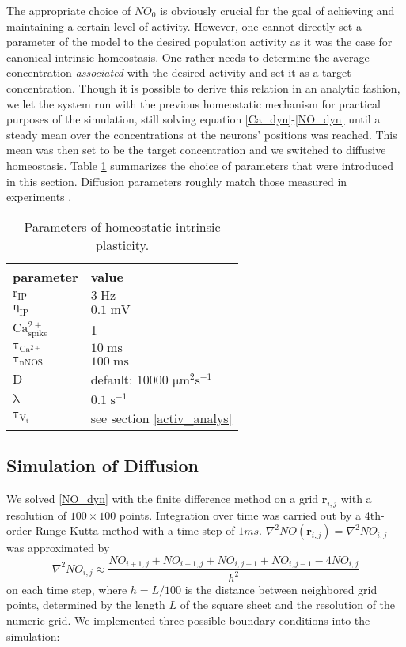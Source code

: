 \documentclass[10pt,a4paper]{article}
\begin{document}
The appropriate choice of $NO_0$ is obviously crucial for the goal of achieving and maintaining a certain level of activity. However, one cannot directly set a parameter of the model to the desired population activity as it was the case for canonical intrinsic homeostasis. One rather needs to determine the average concentration \textit{associated} with the desired activity and set it as a target concentration. Though it is possible to derive this relation in an analytic fashion, we let the system run with the previous homeostatic mechanism for practical purposes of the simulation, still solving equation \eqref{Ca_dyn}-\eqref{NO_dyn} until a steady mean over the concentrations at the neurons' positions was reached. This mean was then set to be the target concentration and we switched to diffusive homeostasis. Table \ref{Params_IP} summarizes the choice of parameters that were introduced in this section. Diffusion parameters roughly match those measured in experiments \cite{Philippides_2000}.
\begin{table}
\begin{tabular}{|l|l|}
\hline
\textbf{parameter} & \textbf{value} \\
\hline
$\mathrm{r_{IP}}$ & $\mathrm{3\;Hz}$ \\
\hline
$\mathrm{\eta_{IP}}$ & $\mathrm{0.1\;mV}$ \\
\hline
$\mathrm{Ca^{2+}_{spike}}$ & 1 \\ \hline
$\mathrm{\tau_{Ca^{2+}}}$ &  $\mathrm{10\;ms}$ \\
\hline
$\mathrm{\tau_{nNOS}}$ & $\mathrm{100\;ms}$ \\
\hline
$\mathrm{D}$ & default: 10000 $\mathrm{\mu m^2 s^{-1}}$ \\
\hline 
$\mathrm{\lambda}$ & $\mathrm{0.1\;s^{-1}}$ \\
\hline
$\mathrm{\tau_{V_t}}$ & see section \ref{activ_analys} \\
\hline
\end{tabular}
\caption{Parameters of homeostatic intrinsic plasticity.}
\label{Params_IP}
\end{table}

\subsection{Simulation of Diffusion}
We solved \eqref{NO_dyn} with the finite difference method on a grid $\mathbf{r}_{i,j}$ with a resolution of $100\times 100$ points. Integration over time was carried out by a 4th-order Runge-Kutta method with a time step of $1 ms$. $\nabla^2 NO(\mathbf{r}_{i,j}) = \nabla^2 NO_{i,j}$ was approximated by
\begin{equation}
\nabla^2 NO_{i,j} \approx \frac{NO_{i+1,j}+NO_{i-1,j}+NO_{i,j+1}+NO_{i,j-1}-4NO_{i,j}}{h^2}
\label{Laplace_Numeric}
\end{equation}
on each time step, where $h = L/100$ is the distance between neighbored grid points, determined by the length $L$ of the square sheet and the resolution of the numeric grid. We implemented three possible boundary conditions into the simulation:
\end{document}
